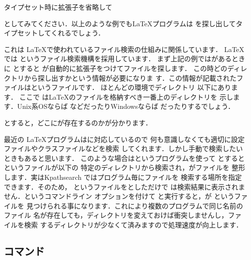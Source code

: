{{{{{\begin{Trick}
タイプセット時に拡張子を省略して
\begin{InTerm}
\end{InTerm}
としてみてください．以上のような例でも{\LaTeX}プログラムは
を探し出してタイプセットしてくれるでしょう．

これは \LaTeX で使われているファイル検索の仕組みに関係しています．
\LaTeX では というファイル検索機構を採用しています．
まず上記の例ではがあるときに  とすると
が自動的に拡張子をつけてファイルを探します．
この時どのディレクトリから探し出すかという情報が必要になりま
す．この情報が記載されたファイルはというファイルです．
ほとんどの環境でディレクトリ  以下にあります．%
%
%
ここで  は{\LaTeX}のファイルを格納すべき一番上のディレクトリを
示します．Unix系OSならば  
などだったりWindowsならば  だったりするでしょう．
\begin{InTerm}
\end{InTerm}
とすると，どこにが存在するのかが分かります．
\end{Trick}

\begin{Trick}
最近の \LaTeX プログラムはに対応しているので
何も意識しなくても適切に設定ファイルやクラスファイルなどを検索
してくれます．しかし手動で検索したいときもあると思います．
このような場合はというプログラムを使って
とするとというファイルが以下の
特定のディレクトリから検索され，がファイルを
整形します．実はKpathsearch ではプログラム毎にファイルを
検索する場所を指定できます．そのため，
というファイルをとしただけで
は検索結果に表示されません．というコマンドライン
オプションを付けて
と実行すると，\pLaTeX が  というファイルを
見つけられる事になります．これにより複数のプログラムで同じ名前のファイル
名が存在しても，ディレクトリを変えておけば衝突しませんし，ファイルを検索
するディレクトリが少なくて済みますので処理速度が向上します．
\end{Trick}



\subsection{コマンド}

}}}}}
